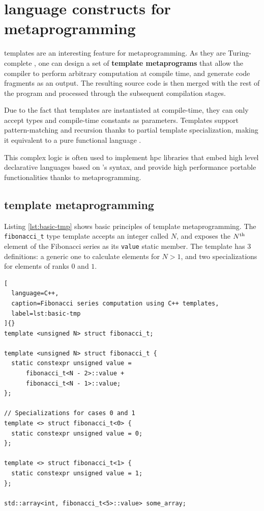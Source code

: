 \documentclass[../main]{subfiles}
\begin{document}
\section{
  \cpp language constructs for metaprogramming
}
\label{lbl:cpp-meta-constructs}

\cpp templates are an interesting feature for metaprogramming. As they
are Turing-complete \cite{unruh:1994}, one can design a set of
\textbf{template metaprograms} \cite{abrahams:2004} that allow the compiler
to perform arbitrary computation at compile time, and generate
\cpp code fragments as an output.
The resulting source code is then merged with the rest of the program
and processed through the subsequent compilation stages.

Due to the fact that templates are instantiated at compile-time, they can only
accept types and compile-time constants as parameters. Templates support
pattern-matching and recursion thanks to partial template specialization,
making it equivalent to a pure functional language \cite{haeri:2012}.

This complex logic is often used to implement \gls{hpc} libraries that embed
high level declarative languages based on \cpp's syntax, and provide
high performance portable functionalities thanks to metaprogramming.

\subsection{
  \cpp template metaprogramming
}

Listing \ref{lst:basic-tmp} shows basic principles of \cpp template
metaprogramming. The \lstinline{fibonacci_t} type template accepts an
integer called $N$, and exposes the $N\textsuperscript{th}$ element
of the Fibonacci series as its \lstinline{value} static member.
The template has 3 definitions:
a generic one to calculate elements for $N > 1$,
and two specializations for elements of ranks $0$ and $1$.

\begin{lstlisting}[
  language=C++,
  caption=Fibonacci series computation using C++ templates,
  label=lst:basic-tmp
]{}
template <unsigned N> struct fibonacci_t;

template <unsigned N> struct fibonacci_t {
  static constexpr unsigned value =
      fibonacci_t<N - 2>::value +
      fibonacci_t<N - 1>::value;
};

// Specializations for cases 0 and 1
template <> struct fibonacci_t<0> {
  static constexpr unsigned value = 0;
};

template <> struct fibonacci_t<1> {
  static constexpr unsigned value = 1;
};

std::array<int, fibonacci_t<5>::value> some_array;
\end{lstlisting}
\end{document}
